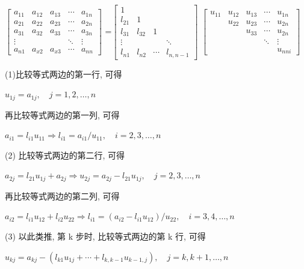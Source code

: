 \documentclass[12pt,a4paper]{article}
\begin{document}
{$\left[\begin{array}{ccccc}{a_{11}} & {a_{12}} & {a_{13}} & {\cdots} & {a_{1 n}} \\ {a_{21}} & {a_{22}} & {a_{23}} & {\cdots} & {a_{2 n}} \\ {a_{31}} & {a_{32}} & {a_{33}} & {\cdots} & {a_{3 n}} \\ {\vdots} & {} & {} & {\ddots} & {\vdots} \\ {a_{n 1}} & {a_{x 2}} & {a_{x 3}} & {\cdots} & {a_{n n}}\end{array}\right]$ =$\left[\begin{array}{cccc}{1} & {} & {} & {} \\ {l_{21}} & {1} & {} & {} \\ {l_{31}} & {l_{32}} & {1} & {} \\ {\vdots} & {} & {} & {\ddots} \\ {l_{n 1}} & {l_{n 2}} & {\cdots} & {l_{n, n-1}}\end{array}\right]$ $\left[\begin{array}{ccccc}{u_{11}} & {u_{12}} & {u_{13}} & {\cdots} & {u_{1 n}} \\ {} & {u_{22}} & {u_{23}} & {\cdots} & {u_{2 n}} \\ {} & {} & {u_{33}} & {\cdots} & {u_{2 n}} \\ {} & {} & {} & {\ddots} & {\vdots} \\ {} & {} & {} & {} & {u_{n n i}}\end{array}\right] $}

\noindent(1)比较等式两边的第一行, 可得

$u_{1 j}=a_{1 j}, \quad j=1,2, \dots, n$

再比较等式两边的第一列, 可得

$a_{i 1}=l_{i 1} u_{11} \Rightarrow l_{i 1}=a_{i 1} / u_{11}, \quad i=2,3, \ldots, n$

\noindent(2) 比较等式两边的第二行, 可得

$a_{2 j}=l_{21} u_{1 j}+a_{2 j} \Rightarrow u_{2 j}=a_{2 j}-l_{21} u_{1 j}, \quad j=2,3, \ldots, n$

再比较等式两边的第二列, 可得

$a_{i 2}=l_{i 1} u_{12}+l_{i 2} u_{22} \Rightarrow l_{i 1}=\left(a_{i 2}-l_{i 1} u_{12}\right) / u_{22}, \quad i=3,4, \ldots, n$

\noindent(3) 以此类推, 第 k 步时, 比较等式两边的第 k 行, 可得

$u_{k j}=a_{k j}-\left(l_{k 1} u_{1 j}+\cdots+l_{k, k-1} u_{k-1, j}\right), \quad j=k, k+1, \ldots, n$
\end{document}

